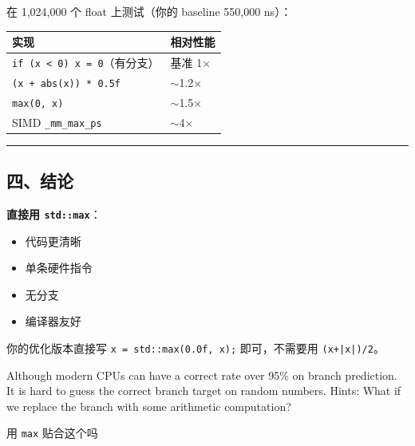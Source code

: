 \documentclass[11pt, a4paper]{article}
\begin{document}
\begin{aibox}
在 1,024,000 个 float 上测试（你的 baseline 550,000 ns）：

\begin{tcolorbox}[colback=white,colframe=gray!50!white,boxrule=0.5pt,arc=2pt,left=5pt,right=5pt,top=5pt,bottom=5pt]
\vspace{0.5em}
\begin{tabularx}{\textwidth}{@{} X l @{}}
\toprule
实现 & 相对性能 \\
\midrule
\texttt{if (x < 0) x = 0}（有分支） & 基准 1$\times$ \\
\texttt{(x + abs(x)) * 0.5f} & $\sim$1.2$\times$ \\
\texttt{max(0, x)} & $\sim$1.5$\times$ \\
SIMD \texttt{\_mm\_max\_ps} & $\sim$4$\times$ \\
\bottomrule
\end{tabularx}
\vspace{0.5em}
\end{tcolorbox}

\begin{center}\rule{\textwidth}{0.4pt}\end{center}

\subsection*{四、结论}

\textbf{直接用 \texttt{std::max}}：
\begin{itemize}
    \item 代码更清晰
    \item 单条硬件指令
    \item 无分支
    \item 编译器友好
\end{itemize}

你的优化版本直接写 \texttt{x = std::max(0.0f, x);} 即可，不需要用 \texttt{(x+|x|)/2}。
\end{aibox}

\vspace{1.5em}

\begin{userbox}
Although modern CPUs can have a correct rate over 95\% on branch prediction. It is
hard to guess the correct branch target on random numbers.
Hints: What if we replace the branch with some arithmetic computation?

用 \texttt{max} 贴合这个吗
\end{userbox}
\end{document}
